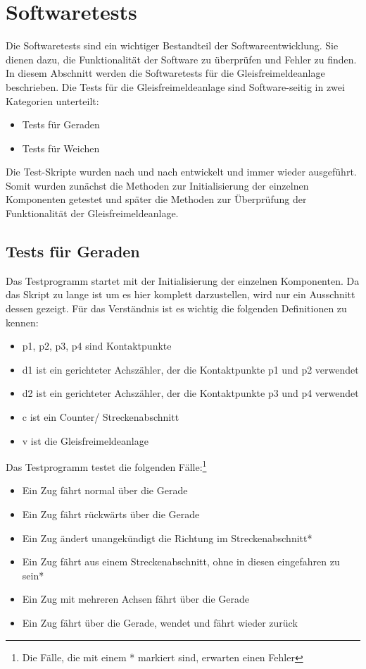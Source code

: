 \section{Softwaretests}\label{text:Entwicklung-der-GFA:Softwaretests}

Die Softwaretests sind ein wichtiger Bestandteil der Softwareentwicklung. Sie dienen dazu, die Funktionalität der Software zu überprüfen und Fehler zu finden. In diesem Abschnitt werden die Softwaretests für die Gleisfreimeldeanlage beschrieben.\newline
Die Tests für die Gleisfreimeldeanlage sind Software-seitig in zwei Kategorien unterteilt:
\begin{itemize}
    \item Tests für Geraden
    \item Tests für Weichen
\end{itemize}
Die Test-Skripte wurden nach und nach entwickelt und immer wieder ausgeführt. Somit wurden zunächst die Methoden zur Initialisierung der einzelnen Komponenten getestet und später die Methoden zur Überprüfung der Funktionalität der Gleisfreimeldeanlage.

\subsection{Tests für Geraden}\label{text:Entwicklung-der-GFA:Softwaretests:Tests-für-Geraden}

Das Testprogramm startet mit der Initialisierung der einzelnen Komponenten. Da das Skript zu lange ist um es hier komplett darzustellen, wird nur ein Ausschnitt dessen gezeigt. Für das Verständnis ist es wichtig die folgenden Definitionen zu kennen:
\begin{itemize}
    \item p1, p2, p3, p4 sind Kontaktpunkte
    \item d1 ist ein gerichteter Achszähler, der die Kontaktpunkte p1 und p2 verwendet
    \item d2 ist ein gerichteter Achszähler, der die Kontaktpunkte p3 und p4 verwendet
    \item c ist ein Counter/ Streckenabschnitt
    \item v ist die Gleisfreimeldeanlage
\end{itemize}

Das Testprogramm testet die folgenden Fälle:\footnote{Die Fälle, die mit einem * markiert sind, erwarten einen Fehler}
\begin{itemize}
    \item Ein Zug fährt normal über die Gerade 
    \item Ein Zug fährt rückwärts über die Gerade
    \item Ein Zug ändert unangekündigt die Richtung im Streckenabschnitt*
    \item Ein Zug fährt aus einem Streckenabschnitt, ohne in diesen eingefahren zu sein*
    \item Ein Zug mit mehreren Achsen fährt über die Gerade
    \item Ein Zug fährt über die Gerade, wendet und fährt wieder zurück
\end{itemize}

